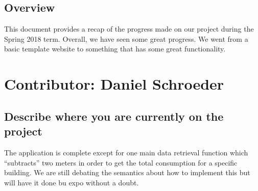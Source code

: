\documentclass[letterpaper,10pt,serif,draftclsnofoot,onecolumn,compsoc,titlepage]{IEEEtran}
\begin{document}
\subsection{Overview}
This document provides a recap of the progress made on our project during the Spring 2018 term. Overall, we have seen some great progress. We went from a basic template website to something that has some great functionality. \\ 
\section{Contributor: Daniel Schroeder} 
\subsection{Describe where you are currently on the project}
The application is complete except for one main data retrieval function which ``subtracts'' two meters in order to get the total consumption for a specific building. We are still debating the semantics about how to implement this but will have it done bu expo without a doubt.
\end{document}
